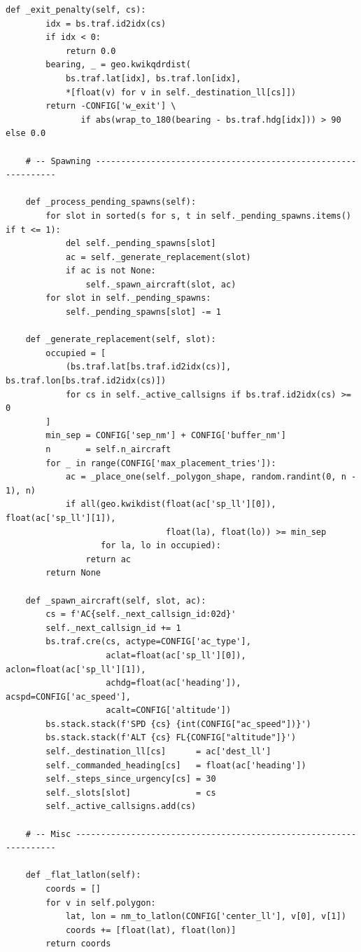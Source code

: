 \documentclass[10pt, a4paper]{article}
\begin{document}
\begin{lstlisting}[caption={v3\_simple\_env.py --- ATCO conflict-resolution environment}, label=lst:env]
    def _exit_penalty(self, cs):
        idx = bs.traf.id2idx(cs)
        if idx < 0:
            return 0.0
        bearing, _ = geo.kwikqdrdist(
            bs.traf.lat[idx], bs.traf.lon[idx],
            *[float(v) for v in self._destination_ll[cs]])
        return -CONFIG['w_exit'] \
               if abs(wrap_to_180(bearing - bs.traf.hdg[idx])) > 90 else 0.0

    # -- Spawning --------------------------------------------------------------

    def _process_pending_spawns(self):
        for slot in sorted(s for s, t in self._pending_spawns.items() if t <= 1):
            del self._pending_spawns[slot]
            ac = self._generate_replacement(slot)
            if ac is not None:
                self._spawn_aircraft(slot, ac)
        for slot in self._pending_spawns:
            self._pending_spawns[slot] -= 1

    def _generate_replacement(self, slot):
        occupied = [
            (bs.traf.lat[bs.traf.id2idx(cs)], bs.traf.lon[bs.traf.id2idx(cs)])
            for cs in self._active_callsigns if bs.traf.id2idx(cs) >= 0
        ]
        min_sep = CONFIG['sep_nm'] + CONFIG['buffer_nm']
        n       = self.n_aircraft
        for _ in range(CONFIG['max_placement_tries']):
            ac = _place_one(self._polygon_shape, random.randint(0, n - 1), n)
            if all(geo.kwikdist(float(ac['sp_ll'][0]), float(ac['sp_ll'][1]),
                                float(la), float(lo)) >= min_sep
                   for la, lo in occupied):
                return ac
        return None

    def _spawn_aircraft(self, slot, ac):
        cs = f'AC{self._next_callsign_id:02d}'
        self._next_callsign_id += 1
        bs.traf.cre(cs, actype=CONFIG['ac_type'],
                    aclat=float(ac['sp_ll'][0]), aclon=float(ac['sp_ll'][1]),
                    achdg=float(ac['heading']), acspd=CONFIG['ac_speed'],
                    acalt=CONFIG['altitude'])
        bs.stack.stack(f'SPD {cs} {int(CONFIG["ac_speed"])}')
        bs.stack.stack(f'ALT {cs} FL{CONFIG["altitude"]}')
        self._destination_ll[cs]      = ac['dest_ll']
        self._commanded_heading[cs]   = float(ac['heading'])
        self._steps_since_urgency[cs] = 30
        self._slots[slot]             = cs
        self._active_callsigns.add(cs)

    # -- Misc ------------------------------------------------------------------

    def _flat_latlon(self):
        coords = []
        for v in self.polygon:
            lat, lon = nm_to_latlon(CONFIG['center_ll'], v[0], v[1])
            coords += [float(lat), float(lon)]
        return coords
\end{lstlisting}
\end{document}

